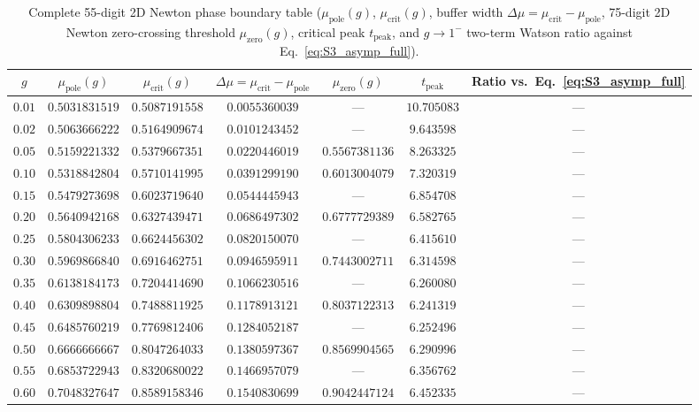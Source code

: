 \documentclass[onecolumn,10pt,notitlepage,amsmath,amssymb,floatfix]{revtex4-2}
\theoremstyle{plain}
\theoremstyle{definition}
\newcommand{\mupole}{\mu_{\mathrm{pole}}}
\newcommand{\mucrit}{\mu_{\mathrm{crit}}}
\newcommand{\muzero}{\mu_{\mathrm{zero}}}
\begin{document}
\begin{table}[h]
\centering
\caption{Complete 55-digit 2D Newton phase boundary table ($\mupole(g)$, $\mucrit(g)$, buffer width $\Delta\mu = \mucrit-\mupole$, 75-digit 2D Newton zero-crossing threshold $\muzero(g)$, critical peak $t_{\mathrm{peak}}$, and $g\to 1^-$ two-term Watson ratio against Eq.~\eqref{eq:S3_asymp_full}).}
\label{tab:S3_full_boundary}
\setlength{\tabcolsep}{5pt}
\begin{tabular}{@{}ccccccc@{}}
\toprule
$g$ & $\mupole(g)$ & $\mucrit(g)$ & $\Delta\mu = \mucrit-\mupole$ & $\muzero(g)$ & $t_{\mathrm{peak}}$ & Ratio vs.\ Eq.~\eqref{eq:S3_asymp_full} \\
\midrule
$0.01$ & $0.5031831519$ & $0.5087191558$ & $0.0055360039$ & ---            & $10.705083$ & --- \\
$0.02$ & $0.5063666222$ & $0.5164909674$ & $0.0101243452$ & ---            & $9.643598$  & --- \\
$0.05$ & $0.5159221332$ & $0.5379667351$ & $0.0220446019$ & $0.5567381136$ & $8.263325$  & --- \\
$0.10$ & $0.5318842804$ & $0.5710141995$ & $0.0391299190$ & $0.6013004079$ & $7.320319$  & --- \\
$0.15$ & $0.5479273698$ & $0.6023719640$ & $0.0544445943$ & ---            & $6.854708$  & --- \\
$0.20$ & $0.5640942168$ & $0.6327439471$ & $0.0686497302$ & $0.6777729389$ & $6.582765$  & --- \\
$0.25$ & $0.5804306233$ & $0.6624456302$ & $0.0820150070$ & ---            & $6.415610$  & --- \\
$0.30$ & $0.5969866840$ & $0.6916462751$ & $0.0946595911$ & $0.7443002711$ & $6.314598$  & --- \\
$0.35$ & $0.6138184173$ & $0.7204414690$ & $0.1066230516$ & ---            & $6.260080$  & --- \\
$0.40$ & $0.6309898804$ & $0.7488811925$ & $0.1178913121$ & $0.8037122313$ & $6.241319$  & --- \\
$0.45$ & $0.6485760219$ & $0.7769812406$ & $0.1284052187$ & ---            & $6.252496$  & --- \\
$0.50$ & $0.6666666667$ & $0.8047264033$ & $0.1380597367$ & $0.8569904565$ & $6.290996$  & --- \\
$0.55$ & $0.6853722943$ & $0.8320680022$ & $0.1466957079$ & ---            & $6.356762$  & --- \\
$0.60$ & $0.7048327647$ & $0.8589158346$ & $0.1540830699$ & $0.9042447124$ & $6.452335$  & --- \\

\end{tabular}
\end{table}
\end{document}
